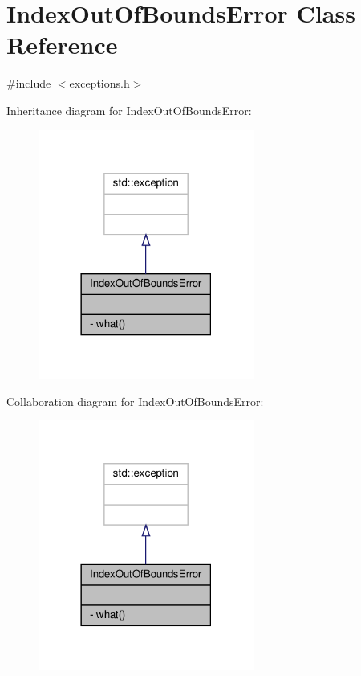 \hypertarget{classIndexOutOfBoundsError}{}\section{Index\+Out\+Of\+Bounds\+Error Class Reference}
\label{classIndexOutOfBoundsError}


{\ttfamily \#include $<$exceptions.\+h$>$}



Inheritance diagram for Index\+Out\+Of\+Bounds\+Error\+:\nopagebreak
\begin{figure}[H]
\begin{center}
\leavevmode
\includegraphics[width=201pt]{classIndexOutOfBoundsError__inherit__graph}
\end{center}
\end{figure}


Collaboration diagram for Index\+Out\+Of\+Bounds\+Error\+:\nopagebreak
\begin{figure}[H]
\begin{center}
\leavevmode
\includegraphics[width=201pt]{classIndexOutOfBoundsError__coll__graph}
\end{center}
\end{figure}
